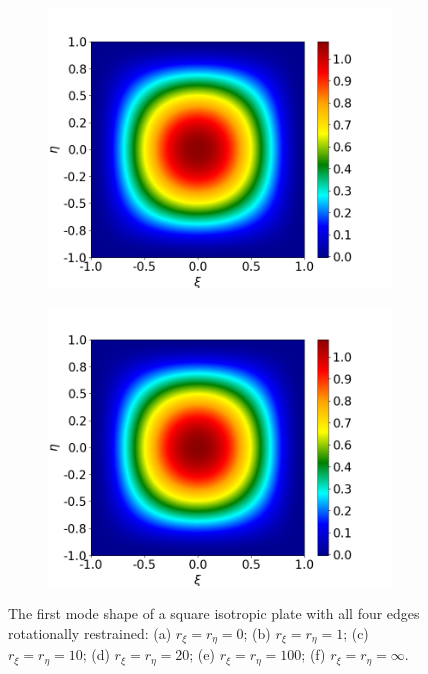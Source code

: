 \documentclass[preprint,12pt]{elsarticle}
\begin{document}
\begin{figure}
\begin{subfigure}[b]{0.49\textwidth}
		\includegraphics[width=\textwidth]{figs/iso100.png}
		\caption[]%
		{{\small}}    
		\label{fig:iso100}
	\end{subfigure}
	\hfill
	\begin{subfigure}[b]{0.49\textwidth}   
		\centering 
		\includegraphics[width=\textwidth]{figs/isoinf.png}
		\caption[]%
		{{\small }}    
		\label{fig:isoinf}
	\end{subfigure}
	\caption[]  
	{\small The first mode shape of a square isotropic plate with all four edges rotationally restrained: (a) $r_{\xi} = r_{\eta} = 0$; (b) $r_{\xi} = r_{\eta} = 1$; (c) $r_{\xi} = r_{\eta} = 10$; (d) $r_{\xi} = r_{\eta} = 20$; (e) $r_{\xi} = r_{\eta} = 100$; (f) $r_{\xi} = r_{\eta} = \infty$.}  
	\label{fig:iso} 
\end{figure}
\end{document}
